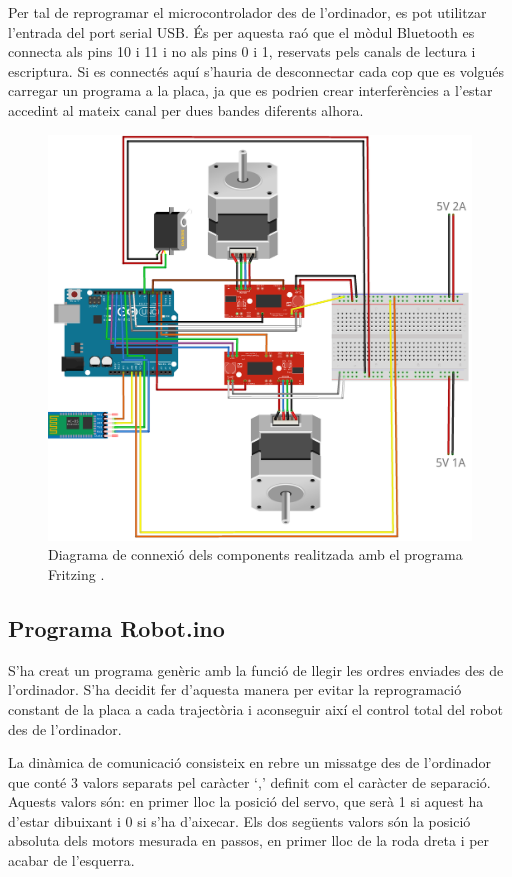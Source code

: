 Per tal de reprogramar el microcontrolador des de l’ordinador, es pot utilitzar l’entrada del port serial USB. És per aquesta raó que el mòdul Bluetooth es connecta als pins 10 i 11 i no als pins 0 i 1, reservats pels canals de lectura i escriptura. Si es connectés aquí s’hauria de desconnectar cada cop que es volgués carregar un programa a la placa, ja que es podrien crear interferències a l'estar accedint al mateix canal per dues bandes diferents alhora. 
\begin{figure}[H]
	\centering
	\includegraphics[scale=0.5]{RobotFritz}
	\caption{Diagrama de connexió dels components realitzada amb el programa Fritzing \cite{FritzingBib}.}
	\label{fig:connexio}
\end{figure}
\subsection{Programa Robot.ino}

S’ha creat un programa genèric amb la funció de llegir les ordres enviades des de l’ordinador. S’ha decidit fer d’aquesta manera per evitar la reprogramació constant de la placa a cada trajectòria i aconseguir així el control total del robot des de l’ordinador. 

La dinàmica de comunicació consisteix en rebre un missatge des de l’ordinador que conté 3 valors separats pel caràcter ‘,’ definit com el caràcter de separació. Aquests valors són: en primer lloc la posició del servo, que serà 1 si aquest ha d’estar dibuixant i 0 si s’ha d’aixecar. Els dos següents valors són la posició absoluta dels motors mesurada en passos, en primer lloc de la roda dreta i per acabar de l’esquerra. 

